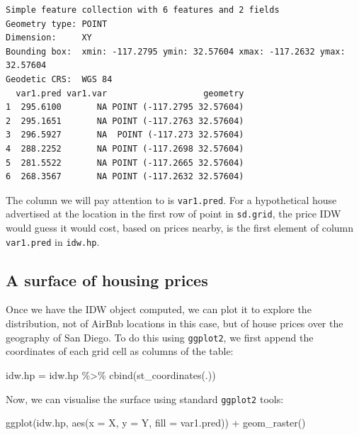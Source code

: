 \documentclass[
  letterpaper,
  DIV=11,
  numbers=noendperiod,
  oneside]{scrreprt}
\newenvironment{Shaded}{\begin{snugshade}}{\end{snugshade}}
\newcommand{\AttributeTok}[1]{\textcolor[rgb]{0.40,0.45,0.13}{#1}}
\newcommand{\FunctionTok}[1]{\textcolor[rgb]{0.28,0.35,0.67}{#1}}
\newcommand{\NormalTok}[1]{\textcolor[rgb]{0.00,0.23,0.31}{#1}}
\newcommand{\OtherTok}[1]{\textcolor[rgb]{0.00,0.23,0.31}{#1}}
\newcommand{\SpecialCharTok}[1]{\textcolor[rgb]{0.37,0.37,0.37}{#1}}
\begin{document}
\begin{verbatim}
Simple feature collection with 6 features and 2 fields
Geometry type: POINT
Dimension:     XY
Bounding box:  xmin: -117.2795 ymin: 32.57604 xmax: -117.2632 ymax: 32.57604
Geodetic CRS:  WGS 84
  var1.pred var1.var                   geometry
1  295.6100       NA POINT (-117.2795 32.57604)
2  295.1651       NA POINT (-117.2763 32.57604)
3  296.5927       NA  POINT (-117.273 32.57604)
4  288.2252       NA POINT (-117.2698 32.57604)
5  281.5522       NA POINT (-117.2665 32.57604)
6  268.3567       NA POINT (-117.2632 32.57604)
\end{verbatim}

The column we will pay attention to is \texttt{var1.pred}. For a
hypothetical house advertised at the location in the first row of point
in \texttt{sd.grid}, the price IDW would guess it would cost, based on
prices nearby, is the first element of column \texttt{var1.pred} in
\texttt{idw.hp}.

\subsection{A surface of housing
prices}\label{a-surface-of-housing-prices}

Once we have the IDW object computed, we can plot it to explore the
distribution, not of AirBnb locations in this case, but of house prices
over the geography of San Diego. To do this using \texttt{ggplot2}, we
first append the coordinates of each grid cell as columns of the table:

\begin{Shaded}
\begin{Highlighting}[]
\NormalTok{idw.hp }\OtherTok{=}\NormalTok{ idw.hp }\SpecialCharTok{\%\textgreater{}\%}
  \FunctionTok{cbind}\NormalTok{(}\FunctionTok{st\_coordinates}\NormalTok{(.))}
\end{Highlighting}
\end{Shaded}

Now, we can visualise the surface using standard \texttt{ggplot2} tools:

\begin{Shaded}
\begin{Highlighting}[]
\FunctionTok{ggplot}\NormalTok{(idw.hp, }\FunctionTok{aes}\NormalTok{(}\AttributeTok{x =}\NormalTok{ X, }\AttributeTok{y =}\NormalTok{ Y, }\AttributeTok{fill =}\NormalTok{ var1.pred)) }\SpecialCharTok{+}
  \FunctionTok{geom\_raster}\NormalTok{()}
\end{Highlighting}
\end{Shaded}
\end{document}
